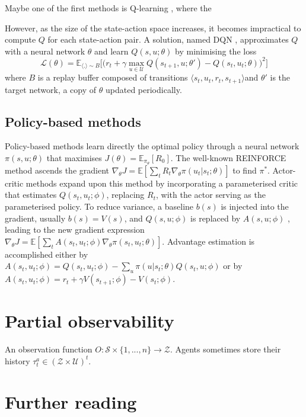 Maybe one of the first methods is Q-learning \citep{watkins1992q}, where the 

However, as the size of the state-action space increases, it becomes impractical to compute $Q$ for each state-action pair.
A solution, named DQN \citep{Mnih2015}, approximates $Q$ with a neural network $\theta$ and learn $Q(s, u;\theta)$ by minimising the loss \begin{equation}
    \mathcal{L}(\theta) = \mathbb{E}_{\langle . \rangle\sim B} \big[\big(r_{t} + \gamma \max_{u \in \mathcal{U}} Q(s_{t+1}, u; \theta')- Q(s_{t}, u_{t}; \theta)\big)^{2}\big]
\end{equation} where $B$ is a replay buffer composed of transitions $\langle s_{t},u_{t},r_{t},s_{t+1}\rangle$and $\theta'$ is the target network, a copy of $\theta$ updated periodically.

\subsection{Policy-based methods} \label{sec:ch2_policy_based_methods}
Policy-based methods learn directly the optimal policy through a neural network $\pi(s, u;\theta)$ that maximises $J(\theta)=\mathbb{E}_{\pi_\theta}[R_0]$.
The well-known REINFORCE method \citep{williams1992simple} ascends the gradient $\nabla_\theta J = \mathbb{E}[\sum_t R_t \nabla_\theta \pi(u_t|s_t;\theta)]$ to find $\pi^*$.
Actor-critic methods \citep{sutton1999policy,konda1999actor} expand upon this method by incorporating a parameterised critic that estimates $Q(s_t, u_t;\phi)$, replacing $R_t$, with the actor serving as the parameterised policy.
To reduce variance, a baseline $b(s)$ is injected into the gradient, usually $b(s) = V(s)$, and $Q(s, u;\phi)$ is replaced by $A(s,u; \phi)$ \citep{10.5555/2074022.2074088}, leading to the new gradient expression $\nabla_\theta J = \mathbb{E}[\sum_t A(s_t, u_t; \phi) \nabla_\theta \pi(s_t, u_t; \theta)]$.
Advantage estimation is accomplished either by $A(s_t,u_t; \phi)=Q(s_t, u_t;\phi)-\sum_u \pi(u|s_t;\theta) Q(s_t,u; \phi)$ or by $A(s_t,u_t; \phi)=r_t +\gamma V(s_{t+1};\phi) - V(s_t;\phi)$.


\section{Partial observability} \label{sec:ch2_partial_observability}
An observation function $O:\mathcal{S} \times \{1,...,n\} \rightarrow \mathcal{Z}$.
Agents sometimes store their history $\tau^a_t \in (\mathcal{Z} \times \mathcal{U})^t$.

\section{Further reading} \label{sec:ch2_futher}
